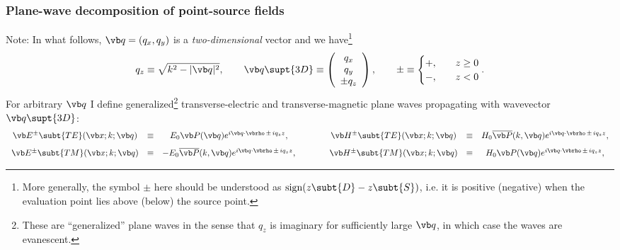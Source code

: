\documentclass[letterpaper]{article}
\begin{document}
\subsubsection{Plane-wave decomposition of point-source fields}

Note: In what follows,
$\vb q=(q_x,q_y)$ is a \textit{two-dimensional} vector and we
have\footnote{More generally, the symbol $\pm$ here should be understood
as $\text{sign}(z\subt{D} - z\subt{S})$, i.e. it is positive (negative) when the evaluation 
point lies above (below) the source point.}
$$ q_z \equiv \sqrt{k^2 - |\vb q|^2}, 
   \qquad
   \vb q\supt{3D}\equiv
   \left(\begin{array}{c}q_x \\ q_y \\ \pm q_z \end{array}\right), 
   \qquad
   \pm \equiv
   \begin{cases}
     +, \quad & z\ge 0 \\ 
     -, \quad & z<   0
   \end{cases}.
$$
For arbitrary $\vb q$ I define generalized\footnote{These 
are ``generalized'' plane waves in the sense that $q_z$ is 
imaginary for sufficiently large $\vb q$, in which case the 
waves are evanescent.} transverse-electric and
transverse-magnetic plane waves propagating with wavevector
$\vb q\supt{3D}$:
$$\begin{array}{ccccccc}
 \vb E^{\pm} \subt{TE}(\vb x; k; \vb q)
   &\equiv& E_0 \vb P(\vb q) e^{i\vb q \cdot \vbrho \, \pm \, iq_z z},
   &\qquad&
 \vb H^{\pm} \subt{TE}(\vb x; k; \vb q)
   &\equiv& H_0 \overline{\vb P}(k, \vb q) e^{i\vb q \cdot \vbrho \, \pm \, iq_z z},
\\[8pt]
 \vb E^{\pm} \subt{TM}(\vb x; k; \vb q)
   &\equiv& -E_0 \overline{\vb P}(k,\vb q) e^{i\vb q \cdot \vbrho \, \pm \, iq_z z},
   &\qquad&
 \vb H^{\pm} \subt{TM}(\vb x; k; \vb q)
   &\equiv& H_0 \vb P(\vb q) e^{i\vb q \cdot \vbrho \, \pm \, iq_z z},
\end{array}$$
\end{document}

